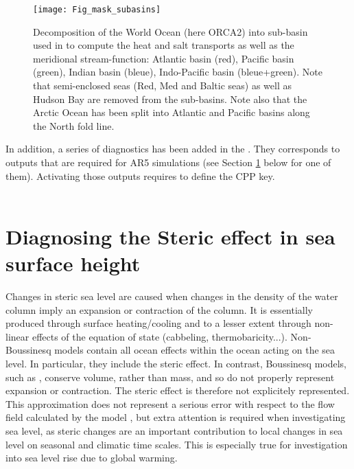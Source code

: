 \documentclass[NEMO_book]{subfiles}
\begin{document}
\begin{figure}[!t] 	  \begin{center}
\texttt{[image: Fig\_mask\_subasins]}
\caption{	\label{Fig_mask_subasins}
Decomposition of the World Ocean (here ORCA2) into sub-basin used in to compute
the heat and salt transports as well as the meridional stream-function: Atlantic basin (red), 
Pacific basin (green), Indian basin (bleue), Indo-Pacific basin (bleue+green). 
Note that semi-enclosed seas (Red, Med and Baltic seas) as well as Hudson Bay 
are removed from the sub-basins. Note also that the Arctic Ocean has been split 
into Atlantic and Pacific basins along the North fold line.  }
\end{center}   \end{figure}  

In addition, a series of diagnostics has been added in the . 
They corresponds to outputs that are required for AR5 simulations 
(see Section \ref{DIA_steric} below for one of them). 
Activating those outputs requires to define the  CPP key.
\\
\\



\section{Diagnosing the Steric effect in sea surface height}
\label{DIA_steric}


Changes in steric sea level are caused when changes in the density of the water 
column imply an expansion or contraction of the column. It is essentially produced 
through surface heating/cooling and to a lesser extent through non-linear effects of 
the equation of state (cabbeling, thermobaricity...).
Non-Boussinesq models contain all ocean effects within the ocean acting 
on the sea level. In particular, they include the steric effect. In contrast, 
Boussinesq models, such as \NEMO, conserve volume, rather than mass, 
and so do not properly represent expansion or contraction. The steric effect is 
therefore not explicitely represented.
This approximation does not represent a serious error with respect to the flow field 
calculated by the model \citep{Greatbatch_JGR94}, but extra attention is required
when investigating sea level, as steric changes are an important 
contribution to local changes in sea level on seasonal and climatic time scales.
This is especially true for investigation into sea level rise due to global warming. 
\end{document}

